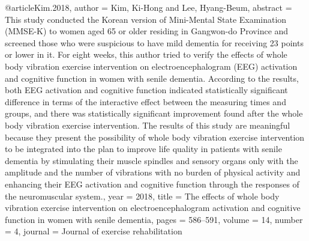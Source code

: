 @article{Kim.2018,
 author = {Kim, Ki-Hong and Lee, Hyang-Beum},
 abstract = {This study conducted the Korean version of Mini-Mental State Examination (MMSE-K) to women aged 65 or older residing in Gangwon-do Province and screened those who were suspicious to have mild dementia for receiving 23 points or lower in it. For eight weeks, this author tried to verify the effects of whole body vibration exercise intervention on electroencephalogram (EEG) activation and cognitive function in women with senile dementia. According to the results, both EEG activation and cognitive function indicated statistically significant difference in terms of the interactive effect between the measuring times and groups, and there was statistically significant improvement found after the whole body vibration exercise intervention. The results of this study are meaningful because they present the possibility of whole body vibration exercise intervention to be integrated into the plan to improve life quality in patients with senile dementia by stimulating their muscle spindles and sensory organs only with the amplitude and the number of vibrations with no burden of physical activity and enhancing their EEG activation and cognitive function through the responses of the neuromuscular system.},
 year = {2018},
 title = {{The effects of whole body vibration exercise intervention on electroencephalogram activation and cognitive function in women with senile dementia}},
 pages = {586--591},
 volume = {14},
 number = {4},
 journal = {{Journal of exercise rehabilitation}}
}


